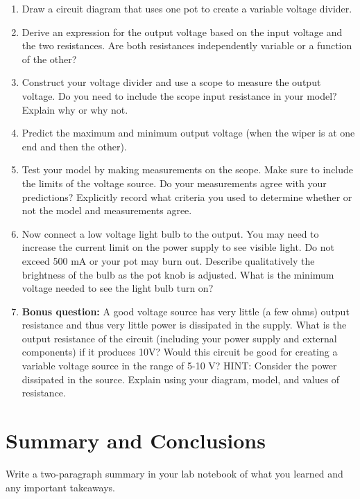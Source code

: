 \documentclass[10pt]{PhysLab1C} %
\begin{document}
\begin{enumerate}
\def\labelenumi{\arabic{enumi}.}
\item
  Draw a circuit diagram that uses one pot to create a variable voltage
  divider.
\item
  Derive an expression for the output voltage based on the input voltage
  and the two resistances. Are both resistances independently variable
  or a function of the other?
\item
  Construct your voltage divider and use a scope to measure the output
  voltage. Do you need to include the scope input resistance in your
  model? Explain why or why not.
\item
  Predict the maximum and minimum output voltage (when the wiper is at
  one end and then the other).
\item
  Test your model by making measurements on the scope. Make sure to
  include the limits of the voltage source. Do your measurements agree
  with your predictions? Explicitly record what criteria you used to
  determine whether or not the model and measurements agree.
\item
  Now connect a low voltage light bulb to the output. You may need to
  increase the current limit on the power supply to see visible light.
  Do not exceed 500 mA or your pot may burn out. Describe qualitatively
  the brightness of the bulb as the pot knob is adjusted. What is the
  minimum voltage needed to see the light bulb turn on?
\item
  \textbf{Bonus question:} A good voltage source has very little (a few
  ohms) output resistance and thus very little power is dissipated in
  the supply. What is the output resistance of the circuit (including
  your power supply and external components) if it produces 10V? Would
  this circuit be good for creating a variable voltage source in the
  range of 5-10 V? HINT: Consider the power dissipated in the source.
  Explain using your diagram, model, and values of resistance.
\end{enumerate}

\section{Summary and Conclusions}

Write a two-paragraph summary in your lab notebook of what you learned
and any important takeaways.

\end{document}
